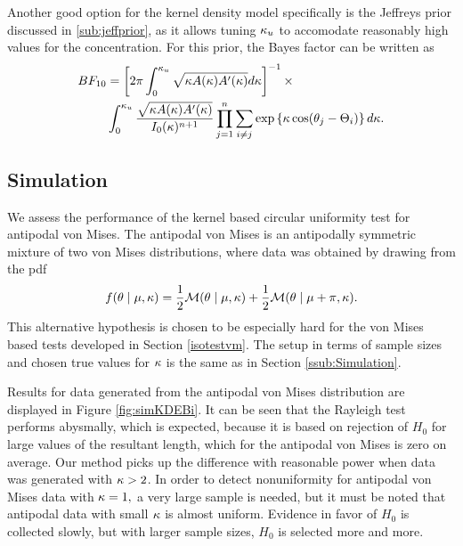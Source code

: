 Another good option for the kernel density model specifically is the Jeffreys prior discussed in \ref{sub:jeffprior}, as it allows tuning \( \kappa_u \) to accomodate reasonably high values for the concentration. For this prior, the Bayes factor can be written as
\begin{align}
 BF_{10} &= \left[ 2 \pi \int_0^{\kappa_u} \sqrt{\kappa A(\kappa) A'(\kappa)} d\kappa \right]^{-1} \times \\ & \int_0^{\kappa_u} \frac{\sqrt{\kappa A(\kappa) A'(\kappa) } }{I_0(\kappa)^{n+1} } \prod_{j = 1}^n \sum_{i \neq j }  \exp \left\{ \kappa \cos(\theta_j - \Theta_i) \right\} d\kappa.
\end{align}

\subsection{Simulation}

We assess the performance of the kernel based circular uniformity test for antipodal von Mises. The antipodal von Mises is an antipodally symmetric mixture of two von Mises distributions, where data was obtained by drawing from the pdf
\begin{equation}
  f(\theta \mid \mu, \kappa) = \frac{1}{2} \mathcal{M} (\theta \mid \mu, \kappa) + \frac{1}{2} \mathcal{M} (\theta \mid \mu + \pi, \kappa).
\end{equation}
This alternative hypothesis is chosen to be especially hard for the von Mises based tests developed in Section \ref{isotestvm}. The setup in terms of sample sizes and chosen true values for \( \kappa \) is the same as in Section \ref{ssub:Simulation}.

Results for data generated from the antipodal von Mises distribution are displayed in Figure \ref{fig:simKDEBi}. It can be seen that the Rayleigh test performs abysmally, which is expected, because it is based on rejection of \( H_0 \) for large values of the resultant length, which for the antipodal von Mises is zero on average. Our method picks up the difference with reasonable power when data was generated with \( \kappa > 2 \). In order to detect nonuniformity for antipodal von Mises data with \( \kappa = 1, \) a very large sample is needed, but it must be noted that antipodal data with small \( \kappa \) is almost uniform. Evidence in favor of \( H_0 \) is collected slowly, but with larger sample sizes, \( H_0 \) is selected more and more.




